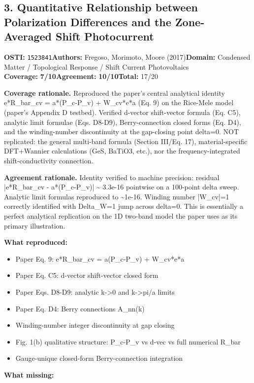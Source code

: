 \documentclass[11pt]{article}
\newcommand{\scorebadge}[2]{\textbf{#1:} \textbf{#2/10}}
\begin{document}
\subsection{3. Quantitative Relationship between Polarization Differences and the Zone-Averaged Shift Photocurrent}
\textbf{OSTI:} \texttt{1523841}\quad\textbf{Authors:} Fregoso, Morimoto, Moore (2017)\quad\textbf{Domain:} Condensed Matter / Topological Response / Shift Current Photovoltaics\\
\scorebadge{Coverage}{7}\quad\scorebadge{Agreement}{10}\quad\textbf{Total:} 17/20\par\smallskip
\noindent\textbf{Coverage rationale.} Reproduced the paper's central analytical identity e*R\_bar\_cv = a*(P\_c-P\_v) + W\_cv*e*a (Eq. 9) on the Rice-Mele model (paper's Appendix D testbed). Verified d-vector shift-vector formula (Eq. C5), analytic limit formulae (Eqs. D8-D9), Berry-connection closed forms (Eq. D4), and the winding-number discontinuity at the gap-closing point delta=0. NOT replicated: the general multi-band formula (Section III/Eq. 17), material-specific DFT+Wannier calculations (GeS, BaTiO3, etc.), nor the frequency-integrated shift-conductivity connection.\par
\noindent\textbf{Agreement rationale.} Identity verified to machine precision: residual |e*R\_bar\_cv - a*(P\_c-P\_v)| \textasciitilde{} 3.3e-16 pointwise on a 100-point delta sweep. Analytic limit formulas reproduced to \textasciitilde{}1e-16. Winding number |W\_cv|=1 correctly identified with Delta\_W=1 jump across delta=0. This is essentially a perfect analytical replication on the 1D two-band model the paper uses as its primary illustration.\par\smallskip
\noindent\textbf{What reproduced:}
\begin{itemize}[leftmargin=1.4em,itemsep=0.2em,topsep=0.2em]
\item Paper Eq. 9: e*R\_bar\_cv = a(P\_c-P\_v) + W\_cv*e*a
\item Paper Eq. C5: d-vector shift-vector closed form
\item Paper Eqs. D8-D9: analytic k-\textgreater{}0 and k-\textgreater{}pi/a limits
\item Paper Eq. D4: Berry connections A\_nn(k)
\item Winding-number integer discontinuity at gap closing
\item Fig. 1(b) qualitative structure: P\_c-P\_v vs d-vec vs full numerical R\_bar
\item Gauge-unique closed-form Berry-connection integration
\end{itemize}\noindent\textbf{What missing:}
\end{document}

